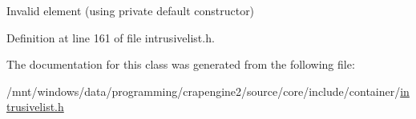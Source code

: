 Invalid element (using private default constructor) 



Definition at line 161 of file intrusivelist.\+h.



The documentation for this class was generated from the following file\+:\begin{DoxyCompactItemize}
\item 
/mnt/windows/data/programming/crapengine2/source/core/include/container/\hyperlink{intrusivelist_8h}{intrusivelist.\+h}\end{DoxyCompactItemize}
